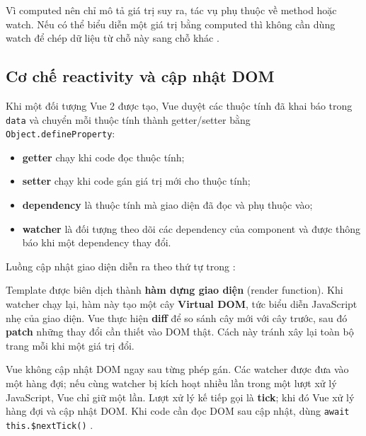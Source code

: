 Vì computed nên chỉ mô tả giá trị suy ra, tác vụ phụ thuộc về method hoặc watch. Nếu
có thể biểu diễn một giá trị bằng
computed thì không cần dùng watch để chép dữ liệu từ chỗ này sang chỗ khác
\cite{vue2-computed}.

\subsection{Cơ chế reactivity và cập nhật DOM}

Khi một đối tượng Vue 2 được tạo, Vue duyệt các thuộc tính đã khai báo trong
\texttt{data} và chuyển mỗi thuộc tính thành getter/setter bằng
\texttt{Object.defineProperty}:

\begin{itemize}
  \item \textbf{getter} chạy khi code đọc thuộc tính;
  \item \textbf{setter} chạy khi code gán giá trị mới cho thuộc tính;
  \item \textbf{dependency} là thuộc tính mà giao diện đã đọc và phụ thuộc vào;
  \item \textbf{watcher} là đối tượng theo dõi các dependency của component và được
  thông báo khi một dependency thay đổi.
\end{itemize}

Luồng cập nhật giao diện diễn ra theo thứ tự trong :

\begin{center}
\resizebox{0.90\textwidth}{!}{}
\label{fig:vue-render-flow}
\end{center}

Template được biên dịch thành \textbf{hàm dựng giao diện} (render function). Khi watcher chạy lại, hàm
này tạo một cây \textbf{Virtual DOM}, tức biểu diễn JavaScript nhẹ của giao diện.
Vue thực hiện \textbf{diff} để so sánh cây mới với cây trước, sau đó \textbf{patch}
những thay đổi cần thiết vào DOM thật. Cách này tránh xây lại toàn bộ trang mỗi khi
một giá trị đổi.

Vue không cập nhật DOM ngay sau từng phép gán. Các watcher được đưa vào một hàng đợi;
nếu cùng watcher bị kích hoạt nhiều lần trong một lượt xử lý JavaScript, Vue chỉ giữ
một lần. Lượt xử lý kế tiếp gọi là \textbf{tick}; khi đó Vue xử lý hàng đợi và cập
nhật DOM. Khi code cần đọc
DOM sau cập nhật, dùng \texttt{await this.\$nextTick()}
\cite{vue2-instance,vue2-reactivity}.

